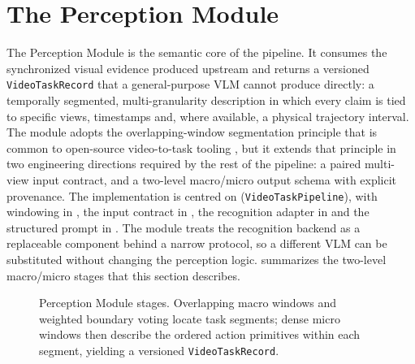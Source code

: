 \documentclass[11pt,oneside]{report}
\begin{document}
\section{The Perception Module}
The Perception Module is the semantic core of the pipeline. It consumes the
synchronized visual evidence produced upstream and returns a versioned
\texttt{VideoTaskRecord} that a general-purpose VLM cannot produce directly: a
temporally segmented, multi-granularity description in which every claim is tied
to specific views, timestamps and, where available, a physical trajectory
interval. The module adopts the overlapping-window segmentation principle that
is common to open-source video-to-task tooling \cite{video2tasks2025}, but it
extends that principle in two engineering directions required by the rest of the
pipeline: a paired multi-view input contract, and a two-level macro/micro output
schema with explicit provenance. The implementation is centred on
 (\texttt{VideoTaskPipeline}), with
windowing in , the input contract in
, the recognition adapter in
 and the structured prompt in
. The module treats the recognition backend as a
replaceable component behind a narrow protocol, so a different VLM can be
substituted without changing the perception logic.
 summarizes the two-level macro/micro stages that this
section describes.

\begin{figure}[htbp]
\centering
{}
\caption[Perception Module stages]{Perception Module stages. Overlapping macro windows and weighted
boundary voting locate task segments; dense micro windows then describe the
ordered action primitives within each segment, yielding a versioned
\texttt{VideoTaskRecord}.}
\label{fig:perception-flow}
\end{figure}
\end{document}
